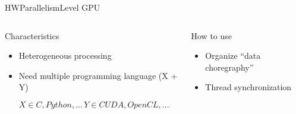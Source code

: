 %
\begin{Frame}{HWParallelismLevel GPU}
  \begin{columns}[t]
    \begin{column}{5cm} %
      \begin{block}{Characteristics}
        \begin{itemize}
        \item Heterogeneous processing
        \item Need multiple programming language (X + Y)

          $X \in {C, Python, ...}\, Y \in {CUDA, OpenCL, ...}$
        \end{itemize}
      \end{block} 
    \end{column}
    
    \begin{column}{5cm} %
      \begin{block}{How to use}
        \begin{itemize}
        \item Organize ``data choregraphy''
        \item Thread synchronization
        \end{itemize}
      \end{block}   
    \end{column}
  \end{columns}  
\end{Frame}


